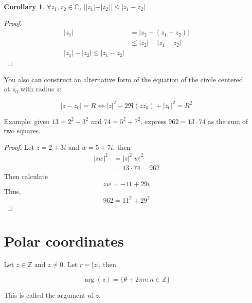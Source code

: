\documentclass{article}
\newtheorem{corollary}[theorem]{Corollary}
\newtheorem{one minute paper}[theorem]{One Minute Paper}
\begin{document}
\begin{corollary}
    $\forall z_1,z_2 \in \mathbb{C}$, $||z_1| - |z_2|| \leq |z_1 - z_2|$
\end{corollary}

\begin{proof}
    \begin{align}
        |z_1| &= |z_2 + (z_1 - z_2)| \\
        &\leq |z_2| + |z_1 - z_2| \\
        |z_1| - |z_2| \leq |z_1 - z_2|
    \end{align}
\end{proof}

You also can construct an alternative form of the equation of the circle centered at $z_0$ with radius $z$:

\begin{equation}
    |z - z_0| = R \iff |z|^2 - 2\Re(z \overline{z_0}) + |z_0|^2 = R^2
\end{equation}

Example: given $13 = 2^2 + 3^2$ and $74 = 5^2 + 7^2$, express $962 = 13 \cdot 74$ as the sum of two squares. 

\begin{proof}
    Let $z = 2 + 3i$ and $w = 5+ 7i$, then 
    \begin{align}
        |zw|^2 &= |z|^2|w|^2 \\
        &= 13 \cdot 74 = 962
    \end{align}
    Then calculate 
    \begin{equation}
        zw = -11 + 29i
    \end{equation}
    Thus, 
    \begin{equation}
        962 = 11^2 + 29^2
    \end{equation}
\end{proof}

\section*{Polar coordinates}

Let $z \in \mathbb{Z}$ and $z \neq 0$. Let $r = |z|$, then 

\begin{equation}
    \arg(z) = \{\theta + 2\pi n: n \in \mathbb{Z}\}
\end{equation}

This is called the argument of $z$. 
\end{document}
